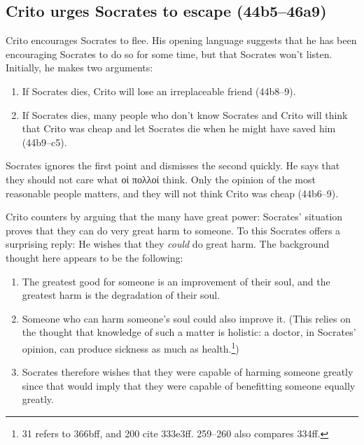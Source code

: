 \documentclass[11pt]{article}
\begin{document}
\subsection{Crito urges Socrates to escape (44b5--46a9)}

Crito encourages Socrates to flee.  His opening language suggests that he has been encouraging Socrates to do so for some time, but that Socrates won't listen.  Initially, he makes two arguments:

\begin{enumerate}
    \item If Socrates dies, Crito will lose an irreplaceable friend (44b8--9).
    \item If Socrates dies, many people who don't know Socrates and Crito will think that Crito was cheap and let Socrates die when he might have saved him (44b9--c5).
\end{enumerate}

Socrates ignores the first point and dismisses the second quickly.  He says that they should not care what οἱ πολλοί think. Only the opinion of the most reasonable people matters, and they will not think Crito was cheap (44b6--9).

Crito counters by arguing that the many have great power:  Socrates' situation proves that they can do very great harm to someone.  To this Socrates offers a surprising reply: He wishes that they \emph{could} do great harm.  The background thought here appears to be the following:

\begin{enumerate}
    \item The greatest good for someone is an improvement of their soul, and the greatest harm is the degradation of their soul.
    \item Someone who can harm someone's soul could also improve it.  (This relies on the thought that knowledge of such a matter is holistic: a doctor, in Socrates' opinion, can produce sickness as much as health.\footnote{\citet{adam1988} 31 refers to  366bff, and \citet{brickhouse2004} 200 cite  333e3ff.  \citet{burnet1924} 259--260 also compares  334ff.})
    \item Socrates therefore wishes that they were capable of harming someone greatly since that would imply that they were capable of benefitting someone equally greatly.
\end{enumerate}
\end{document}
